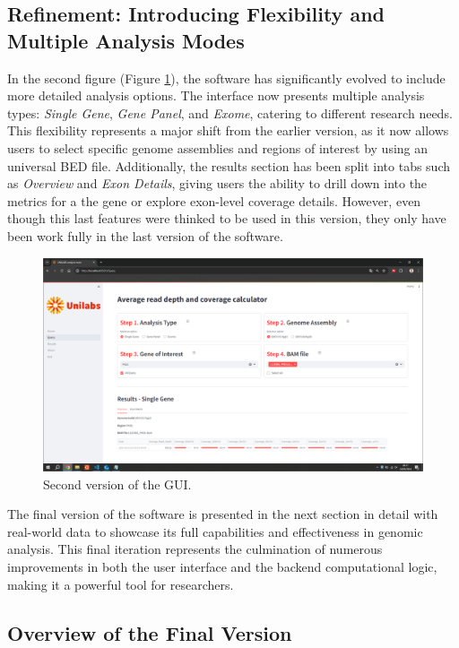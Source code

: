\subsection{Refinement: Introducing Flexibility and Multiple Analysis Modes}

In the second figure (Figure \ref{fig:v2}), the software has significantly evolved to include more detailed analysis options. The interface now presents multiple analysis types: \textit{Single Gene}, \textit{Gene Panel}, and \textit{Exome}, catering to different research needs. This flexibility represents a major shift from the earlier version, as it now allows users to select specific genome assemblies and regions of interest by using an universal BED file. Additionally, the results section has been split into tabs such as \textit{Overview} and \textit{Exon Details}, giving users the ability to drill down into the metrics for a the gene or explore exon-level coverage details. However, even though this last features were thinked to be used in this version, they only have been work fully in the last version of the software.

\begin{figure}[H]
    \centering
    \includegraphics[width=1\textwidth]{figs/v2.png}
    \caption{Second version of the GUI.} 
    \label{fig:v2}
\end{figure}


The final version of the software is presented in the next section in detail with real-world data to showcase its full capabilities and effectiveness in genomic analysis. This final iteration represents the culmination of numerous improvements in both the user interface and the backend computational logic, making it a powerful tool for researchers.

\subsection{Overview of the Final Version}

